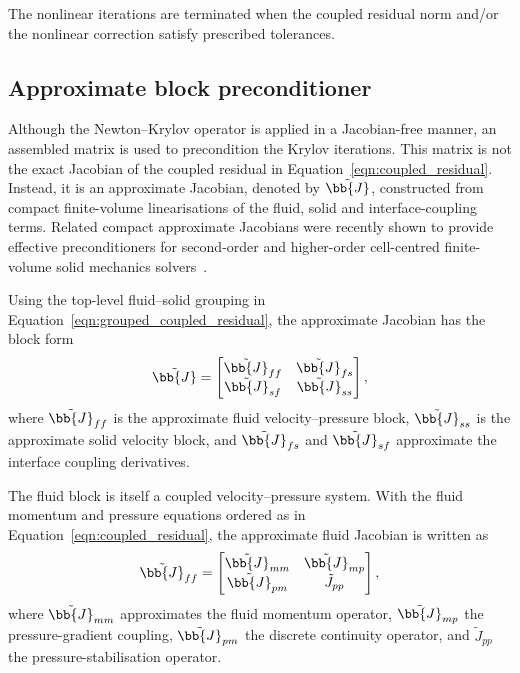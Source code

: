 The nonlinear iterations are terminated when the coupled residual norm and/or the nonlinear correction satisfy prescribed tolerances.


\subsection{Approximate block preconditioner}
\label{qm:sec:approximate_block_preconditioner}

Although the Newton--Krylov operator is applied in a Jacobian-free manner, an
assembled matrix is used to precondition the Krylov iterations. This matrix is
not the exact Jacobian of the coupled residual in
Equation~\eqref{eqn:coupled_residual}. Instead, it is an approximate Jacobian,
denoted by $\tilde{\bb{J}}$, constructed from compact finite-volume
linearisations of the fluid, solid and interface-coupling terms. Related
compact approximate Jacobians were recently shown to provide effective
preconditioners for second-order and higher-order cell-centred finite-volume
solid mechanics solvers~\citep{Cardiff2026, Batistic2026}.

Using the top-level fluid--solid grouping in Equation~\eqref{eqn:grouped_coupled_residual}, the approximate Jacobian has the
block form
\begin{equation}
    \tilde{\bb{J}}
    =
    \begin{bmatrix}
    \tilde{\bb{J}}_{ff} & \tilde{\bb{J}}_{fs} \\
    \tilde{\bb{J}}_{sf} & \tilde{\bb{J}}_{ss}
    \end{bmatrix},
    \label{qm:eqn:block_preconditioner}
\end{equation}
where $\tilde{\bb{J}}_{ff}$ is the approximate fluid velocity--pressure block,
$\tilde{\bb{J}}_{ss}$ is the approximate solid velocity block, and
$\tilde{\bb{J}}_{fs}$ and $\tilde{\bb{J}}_{sf}$ approximate the interface
coupling derivatives.

The fluid block is itself a coupled velocity--pressure system. With the fluid
momentum and pressure equations ordered as in
Equation~\eqref{eqn:coupled_residual}, the approximate fluid Jacobian is written
as
\begin{equation}
    \tilde{\bb{J}}_{ff}
    =
    \begin{bmatrix}
    \tilde{\bb{J}}_{mm} & \tilde{\bb{J}}_{mp} \\
    \tilde{\bb{J}}_{pm} & \tilde{J}_{pp}
    \end{bmatrix},
    \label{qm:eqn:fluid_block_preconditioner}
\end{equation}
where $\tilde{\bb{J}}_{mm}$ approximates the fluid momentum operator,
$\tilde{\bb{J}}_{mp}$ the pressure-gradient coupling,
$\tilde{\bb{J}}_{pm}$ the discrete continuity operator, and
$\tilde{J}_{pp}$ the pressure-stabilisation operator.

